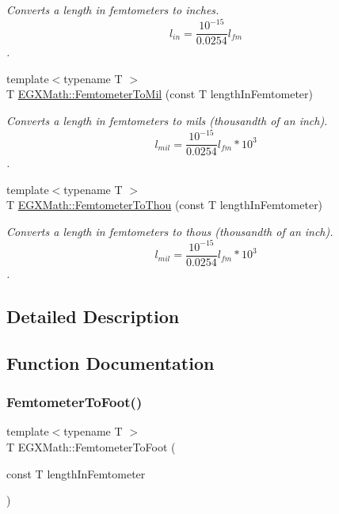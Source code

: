 \begin{DoxyCompactItemize}
\begin{DoxyCompactList}\small\item\em Converts a length in femtometers to inches. \[ l_{in}= \frac{10^{-15}}{0.0254} l_{fm} \]. \end{DoxyCompactList}\item 
{\footnotesize template$<$typename T $>$ }\\T \mbox{\hyperlink{group___e_g_x_math-_conversions-_length_conversions-_s_i-_femtometer-_imperial_gacfcd599a1c2c834f3bbb5f3f991d55df}{E\+G\+X\+Math\+::\+Femtometer\+To\+Mil}} (const T length\+In\+Femtometer)
\begin{DoxyCompactList}\small\item\em Converts a length in femtometers to mils (thousandth of an inch). \[ l_{mil}= \frac{10^{-15}}{0.0254} l_{fm} * 10^{3} \]. \end{DoxyCompactList}\item 
{\footnotesize template$<$typename T $>$ }\\T \mbox{\hyperlink{group___e_g_x_math-_conversions-_length_conversions-_s_i-_femtometer-_imperial_ga5c277d07215ad164ba2ad94e25b02ff1}{E\+G\+X\+Math\+::\+Femtometer\+To\+Thou}} (const T length\+In\+Femtometer)
\begin{DoxyCompactList}\small\item\em Converts a length in femtometers to thous (thousandth of an inch). \[ l_{mil}= \frac{10^{-15}}{0.0254} l_{fm} * 10^{3} \]. \end{DoxyCompactList}\end{DoxyCompactItemize}


\subsection{Detailed Description}


\subsection{Function Documentation}
\mbox{\label{group___e_g_x_math-_conversions-_length_conversions-_s_i-_femtometer-_imperial_gaa33efbf3b5cee0874ad44736c0ac6fd2}} 
\subsubsection{\texorpdfstring{Femtometer\+To\+Foot()}{FemtometerToFoot()}}
{\footnotesize\ttfamily template$<$typename T $>$ \\
T E\+G\+X\+Math\+::\+Femtometer\+To\+Foot (\begin{DoxyParamCaption}\item[{const T}]{length\+In\+Femtometer }\end{DoxyParamCaption})}



